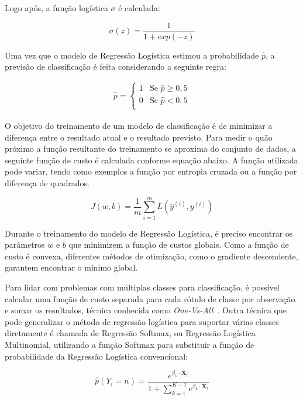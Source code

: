 \documentclass[portugues]{ic-tese}
\begin{document}
Logo após, a função logística $\sigma$ é calculada:

\begin{equation}
\sigma (z) = \frac{1}{1 + exp(-z)}
\end{equation}

Uma vez que o modelo de Regressão Logística estimou a probabilidade $\hat{p}$, a previsão de classificação é feita considerando a seguinte regra:

\begin{equation}
	\begin{aligned}
	\hat{p} = 
	\begin{cases}
	1 & \text{Se $\hat{p} \geq 0,5$}\\
	0 & \text{Se $\hat{p} < 0,5$}\\
	\end{cases}
	\end{aligned}
\end{equation}

O objetivo do treinamento de um modelo de classificação é de minimizar a diferença entre o resultado atual e o resultado previsto. Para medir o quão próximo a função resultante do treinamento se aproxima do conjunto de dados, a seguinte função de custo é calculada conforme equação abaixo. A função utilizada pode variar, tendo como exemplos a função por entropia cruzada ou a função por diferença de quadrados.

\begin{equation}
J(w,b) = \frac{1}{m} \sum^{m}_{i=1} L(\hat{y}^{(i)}, y^{(i)})
\end{equation}

Durante o treinamento do modelo de Regressão Logística, é preciso encontrar os parâmetros $w$ e $b$ que minimizem a função de custos globais. Como a função de custo é convexa, diferentes métodos de otimização, como o gradiente descendente, garantem encontrar o mínimo global.

Para lidar com problemas com múltiplas classes para classificação, é possível calcular uma função de custo separada para cada rótulo de classe por observação e somar os resultados, técnica conhecida como \textit{One-Vs-All}~\citep{Rifkin_2004}. Outra técnica que pode generalizar o método de regressão logística para suportar várias classes diretamente é chamada de Regressão Softmax, ou Regressão Logística Multinomial, utilizando a função Softmax para substituir a função de probabilidade da Regressão Logística convencional:

\begin{equation}
\hat{p}(Y_i = n) = \frac{e^{\beta_{n} \cdot \textbf{X}_{i}}}{1 + \sum^{K-1}_{k=1} e^{\beta_{k} \cdot \textbf{X}_{i}}}
\end{equation}
\end{document}
